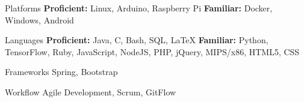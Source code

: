
\vspace{0mm}
\begin{cvskills}

  \vspace{0mm}


  \cvskill
    {Platforms} %
    {\textbf{Proficient:} Linux, Arduino, Raspberry Pi \newline \textbf{Familiar:} Docker, Windows, Android} %

  \vspace{0mm}
  
  \cvskill
    {Languages} %
    {\textbf{Proficient:} Java, C, Bash, SQL, LaTeX \newline \textbf{Familiar:} Python, TensorFlow, Ruby, JavaScript, NodeJS, PHP, jQuery, MIPS/x86, HTML5, CSS} %

  \vspace{0mm}

  \cvskill
    {Frameworks} %
    {Spring, Bootstrap} %

  \vspace{0mm}

  \cvskill
    {Workflow} %
    {Agile Development, Scrum, GitFlow} %

\end{cvskills}